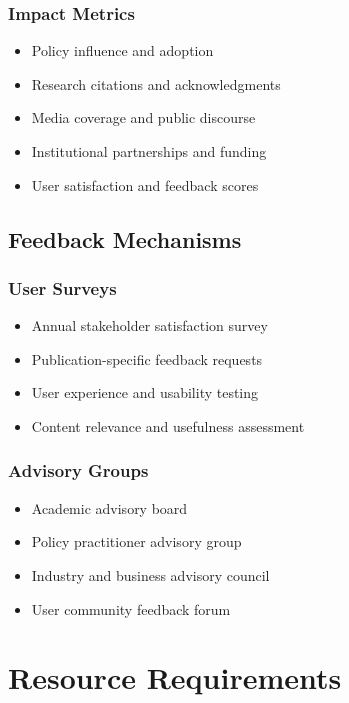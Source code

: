 \documentclass[11pt,a4paper]{article}
\begin{document}
\subsubsection{Impact Metrics}
\begin{itemize}
    \item Policy influence and adoption
    \item Research citations and acknowledgments
    \item Media coverage and public discourse
    \item Institutional partnerships and funding
    \item User satisfaction and feedback scores
\end{itemize}

\subsection{Feedback Mechanisms}

\subsubsection{User Surveys}
\begin{itemize}
    \item Annual stakeholder satisfaction survey
    \item Publication-specific feedback requests
    \item User experience and usability testing
    \item Content relevance and usefulness assessment
\end{itemize}

\subsubsection{Advisory Groups}
\begin{itemize}
    \item Academic advisory board
    \item Policy practitioner advisory group
    \item Industry and business advisory council
    \item User community feedback forum
\end{itemize}

\section{Resource Requirements}
\end{document}
